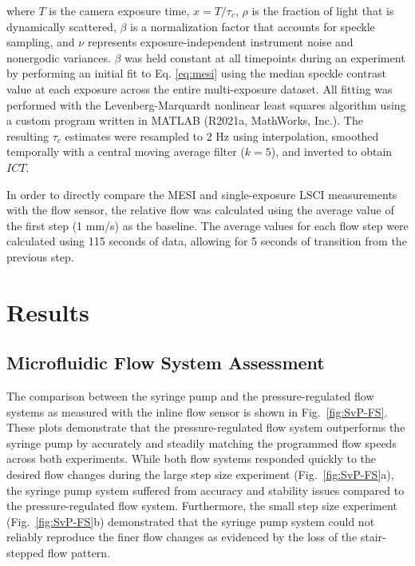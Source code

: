 \documentclass[12pt]{spieman}
\begin{document}
\begin{spacing}{2}
\noindent where $T$ is the camera exposure time, $x=T/\tau_c$, $\rho$ is the fraction of light that is dynamically scattered, $\beta$ is a normalization factor that accounts for speckle sampling, and $\nu$ represents exposure-independent instrument noise and nonergodic variances. $\beta$ was held constant at all timepoints during an experiment by performing an initial fit to Eq. \ref{eq:mesi} using the median speckle contrast value at each exposure across the entire multi-exposure dataset. All fitting was performed with the Levenberg-Marquardt nonlinear least squares algorithm \cite{Lourakis:J2fCMU5i} using a custom program written in MATLAB (R2021a, MathWorks, Inc.). The resulting $\tau_c$ estimates were resampled to 2 Hz using interpolation, smoothed temporally with a central moving average filter ($k=5$), and inverted to obtain $ICT$.

In order to directly compare the MESI and single-exposure LSCI measurements with the flow sensor, the relative flow was calculated using the average value of the first step (1 mm/s) as the baseline. The average values for each flow step were calculated using 115 seconds of data, allowing for 5 seconds of transition from the previous step.


\section{Results}
\label{sect:results}

\subsection{Microfluidic Flow System Assessment}

The comparison between the syringe pump and the pressure-regulated flow systems as measured with the inline flow sensor is shown in Fig.~\ref{fig:SvP-FS}. These plots demonstrate that the pressure-regulated flow system outperforms the syringe pump by accurately and steadily matching the programmed flow speeds across both experiments. While both flow systems responded quickly to the desired flow changes during the large step size experiment (Fig.~\ref{fig:SvP-FS}a), the syringe pump system suffered from accuracy and stability issues compared to the pressure-regulated flow system. Furthermore, the small step size experiment (Fig.~\ref{fig:SvP-FS}b) demonstrated that the syringe pump system could not reliably reproduce the finer flow changes as evidenced by the loss of the stair-stepped flow pattern.


\end{spacing}
\end{document}
